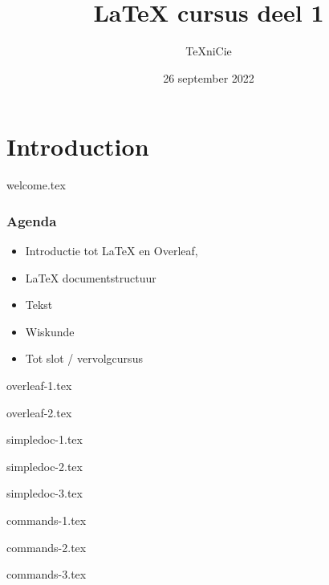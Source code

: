 \documentclass[allauthors]{../../cursuspresentatie}
\title{\LaTeX{} cursus deel 1}
\author{\TeX niCie}
\date{26 september 2022}
\def\importslide#1#2{%
	{#2}
}
\begin{document}
\section{Introduction}
\importslide{beginners}{welcome.tex}

\begin{frame}
	\frametitle{Agenda}
	
	\begin{itemize}
		\item Introductie tot LaTeX en Overleaf,
		\item LaTeX documentstructuur
		\item Tekst
		\item Wiskunde
		\item Tot slot / vervolgcursus
	\end{itemize}
\end{frame}

\importslide{beginners_NL}{overleaf-1.tex}
\importslide{beginners_NL}{overleaf-2.tex}


\importslide{beginners_NL}{simpledoc-1.tex}
\importslide{beginners_NL}{simpledoc-2.tex}
\importslide{beginners_NL}{simpledoc-3.tex}


\importslide{beginners_NL}{commands-1.tex}
\importslide{beginners_NL}{commands-2.tex}
\importslide{beginners_NL}{commands-3.tex}
\end{document}
